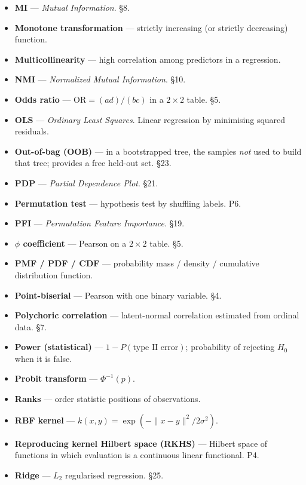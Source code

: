 \documentclass{article}
\begin{document}
\begin{itemize}
  \textbf{MIC} --- \emph{Maximal Information Coefficient}. §9.
\item
  \textbf{MI} --- \emph{Mutual Information}. §8.
\item
  \textbf{Monotone transformation} --- strictly increasing (or strictly
  decreasing) function.
\item
  \textbf{Multicollinearity} --- high correlation among predictors in a
  regression.
\item
  \textbf{NMI} --- \emph{Normalized Mutual Information}. §10.
\item
  \textbf{Odds ratio} --- \(\mathrm{OR} = (ad)/(bc)\) in a
  \(2 \times 2\) table. §5.
\item
  \textbf{OLS} --- \emph{Ordinary Least Squares}. Linear regression by
  minimising squared residuals.
\item
  \textbf{Out-of-bag (OOB)} --- in a bootstrapped tree, the samples
  \emph{not} used to build that tree; provides a free held-out set. §23.
\item
  \textbf{PDP} --- \emph{Partial Dependence Plot}. §21.
\item
  \textbf{Permutation test} --- hypothesis test by shuffling labels. P6.
\item
  \textbf{PFI} --- \emph{Permutation Feature Importance}. §19.
\item
  \textbf{\(\phi\) coefficient} --- Pearson on a \(2 \times 2\) table.
  §5.
\item
  \textbf{PMF / PDF / CDF} --- probability mass / density / cumulative
  distribution function.
\item
  \textbf{Point-biserial} --- Pearson with one binary variable. §4.
\item
  \textbf{Polychoric correlation} --- latent-normal correlation
  estimated from ordinal data. §7.
\item
  \textbf{Power (statistical)} --- \(1 - P(\text{type II error})\);
  probability of rejecting \(H_0\) when it is false.
\item
  \textbf{Probit transform} --- \(\Phi^{-1}(p)\).
\item
  \textbf{Ranks} --- order statistic positions of observations.
\item
  \textbf{RBF kernel} --- \(k(x, y) = \exp(-\|x - y\|^2 / 2\sigma^2)\).
\item
  \textbf{Reproducing kernel Hilbert space (RKHS)} --- Hilbert space of
  functions in which evaluation is a continuous linear functional. P4.
\item
  \textbf{Ridge} --- \(L_2\) regularised regression. §25.

\end{itemize}
\end{document}
